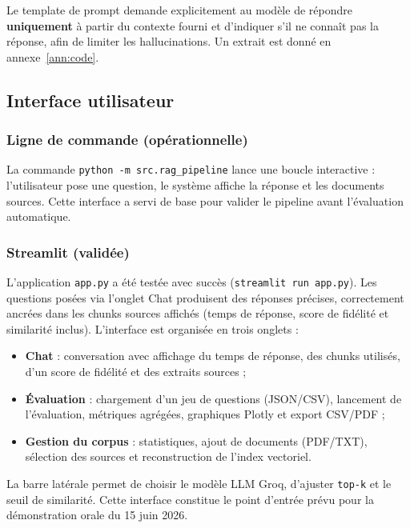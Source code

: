 Le template de prompt demande explicitement au mod\`ele de r\'epondre \textbf{uniquement} \`a partir
du contexte fourni et d'indiquer s'il ne conna\^it pas la r\'eponse, afin de limiter les
hallucinations. Un extrait est donn\'e en annexe~\ref{ann:code}.

\subsection{Interface utilisateur}

\subsubsection{Ligne de commande (op\'erationnelle)}

La commande \texttt{python -m src.rag\_pipeline} lance une boucle interactive : l'utilisateur
pose une question, le syst\`eme affiche la r\'eponse et les documents sources. Cette interface
a servi de base pour valider le pipeline avant l'\'evaluation automatique.

\subsubsection{Streamlit (valid\'ee)}

L'application \texttt{app.py} a \'et\'e test\'ee avec succ\`es (\texttt{streamlit run app.py}).
Les questions pos\'ees via l'onglet Chat produisent des r\'eponses pr\'ecises, correctement
ancr\'ees dans les chunks sources affich\'es (temps de r\'eponse, score de fid\'elit\'e et
similarit\'e inclus). L'interface est organis\'ee en trois onglets :
\begin{itemize}[noitemsep]
  \item \textbf{Chat} : conversation avec affichage du temps de r\'eponse, des chunks utilis\'es,
        d'un score de fid\'elit\'e et des extraits sources ;
  \item \textbf{\'Evaluation} : chargement d'un jeu de questions (JSON/CSV), lancement de
        l'\'evaluation, m\'etriques agr\'eg\'ees, graphiques Plotly et export CSV/PDF ;
  \item \textbf{Gestion du corpus} : statistiques, ajout de documents (PDF/TXT), s\'election des
        sources et reconstruction de l'index vectoriel.
\end{itemize}

La barre lat\'erale permet de choisir le mod\`ele LLM Groq, d'ajuster \texttt{top-k} et le seuil
de similarit\'e. Cette interface constitue le point d'entr\'ee pr\'evu pour la d\'emonstration
orale du 15 juin 2026.

